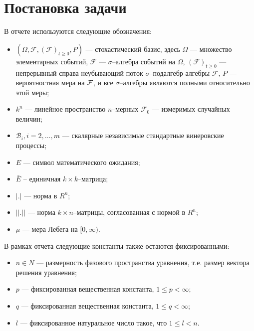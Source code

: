 \section{Постановка задачи}\label{sec:kri-1}

В отчете используются
следующие обозначения:
\begin{itemize}
    \item $(\Omega , {\mathcal F}, ({\mathcal
    F})_{t\ge0},P)$ --- стохастический базис, здесь $ \Omega $ ---
    множество
    элементарных событий, ${\mathcal F}$ --- $\sigma$--алгебра событий на
    $\Omega$,  $({\mathcal F})_{t\ge 0}$ --- непрерывный справа неубывающий поток
    $\sigma$--подалгебр алгебры ${\mathcal F}$, $P$ --- вероятностная
    мера на ${\cal F}$, и  все $\sigma$--алгебры являются полными относительно этой
    меры;
    \item $k^n$ --- линейное пространство $n$--мерных ${\mathcal F}_0$ ---
    измеримых случайных величин;
    \item $\mathcal B_i,i=2,\dots,m$ --- скалярные независимые стандартные
    винеровские процессы;
    \item  $E$ --- символ математического
    ожидания;
    \item $\bar E$ -- единичная $k \times k$--матрица;
    \item  $|.|$ --- норма в $R^n$;
    \item $||.||$
    --- норма $k\times n$--матрицы, согласованная с нормой в $R^n$;
    \item $\mu$ --- мера Лебега на $[0,\infty)$.
\end{itemize}


В рамках отчета следующие константы также остаются фиксированными:
\begin{itemize}
    \item $n \in N$ --- размерность фазового пространства уравнения, т.е. размер вектора решения уравнения;
    \item $p$ --- фиксированная вещественная константа, $1 \le  p < \infty $;
    \item $q$ --- фиксированная вещественная константа, $1 \le  q < \infty $;
    \item $l$ --- фиксированное натуральное число такое, что $1 \le  l < n$.
\end{itemize}

